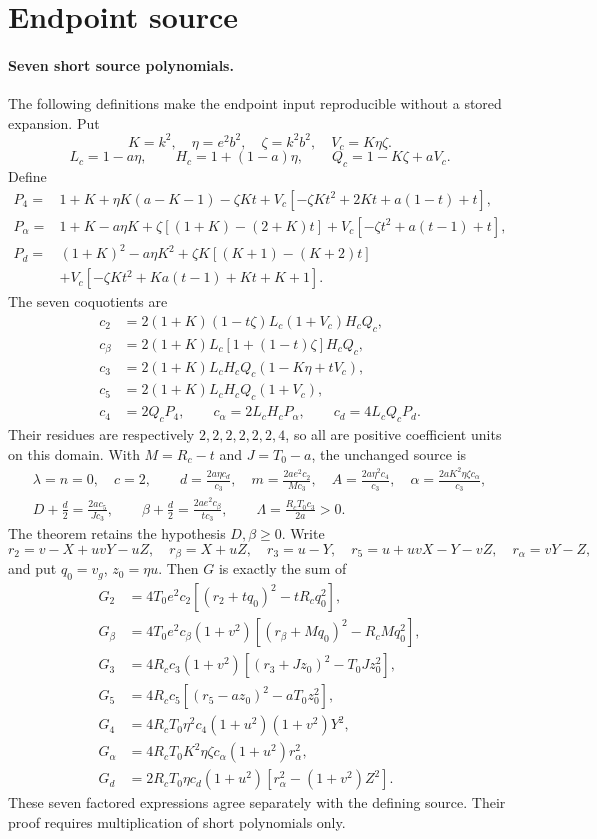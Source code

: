 \section{\texorpdfstring{Endpoint source}{Endpoint source}}
\label{component:p7d4e5164e84a}
\paragraph{Seven short source polynomials.}
The following definitions make the endpoint input reproducible without a stored expansion. Put
\[
K=k^2,\quad \eta=e^2b^2,\quad\zeta=k^2b^2,\quad V_c=K\eta\zeta.
\]
\[
L_c=1-a\eta,\qquad H_c=1+(1-a)\eta,\qquad Q_c=1-K\zeta+aV_c.
\]
Define
\begin{align*}
P_4={}&1+K+\eta K(a-K-1)-\zeta Kt
 +V_c[-\zeta Kt^2+2Kt+a(1-t)+t],\\
P_\alpha={}&1+K-a\eta K+\zeta[(1+K)-(2+K)t]
 +V_c[-\zeta t^2+a(t-1)+t],\\
P_d={}&(1+K)^2-a\eta K^2+\zeta K[(K+1)-(K+2)t]\\
&+V_c[-\zeta Kt^2+Ka(t-1)+Kt+K+1].
\end{align*}
The seven coquotients are
\begin{align*}
c_2&=2(1+K)(1-t\zeta)L_c(1+V_c)H_cQ_c,\\
c_\beta&=2(1+K)L_c[1+(1-t)\zeta]H_cQ_c,\\
c_3&=2(1+K)L_cH_cQ_c(1-K\eta+tV_c),\\
c_5&=2(1+K)L_cH_cQ_c(1+V_c),\\
c_4&=2Q_cP_4,\qquad c_\alpha=2L_cH_cP_\alpha,
\qquad c_d=4L_cQ_cP_d.
\end{align*}
Their residues are respectively $2,2,2,2,2,2,4$, so all are positive coefficient units on this domain. With $M=R_c-t$ and $J=T_0-a$, the unchanged source is
\begin{gather*}
\lambda=n=0,\quad c=2,\qquad
d=\frac{2a\eta c_d}{c_3},\quad m=\frac{2ae^2c_2}{Mc_3},\quad
A=\frac{2a\eta^2c_4}{c_3},\quad
\alpha=\frac{2aK^2\eta\zeta c_\alpha}{c_3},\\
D+\frac d2=\frac{2ac_5}{Jc_3},\qquad
\beta+\frac d2=\frac{2ae^2c_\beta}{tc_3},\qquad
\Lambda=\frac{R_cT_0c_3}{2a}>0.
\end{gather*}
The theorem retains the hypothesis $D,\beta\ge0$. Write
\[
r_2=v-X+uvY-uZ,\quad r_\beta=X+uZ,\quad r_3=u-Y,
\quad r_5=u+uvX-Y-vZ,\quad r_\alpha=vY-Z,
\]
and put $q_0=v_g$, $z_0=\eta u$. Then $G$ is exactly the sum of
\begin{align*}
G_2&=4T_0e^2c_2[(r_2+tq_0)^2-tR_cq_0^2],\\
G_\beta&=4T_0e^2c_\beta(1+v^2)[(r_\beta+Mq_0)^2-R_cMq_0^2],\\
G_3&=4R_cc_3(1+v^2)[(r_3+Jz_0)^2-T_0Jz_0^2],\\
G_5&=4R_cc_5[(r_5-az_0)^2-aT_0z_0^2],\\
G_4&=4R_cT_0\eta^2c_4(1+u^2)(1+v^2)Y^2,\\
G_\alpha&=4R_cT_0K^2\eta\zeta c_\alpha(1+u^2)r_\alpha^2,\\
G_d&=2R_cT_0\eta c_d(1+u^2)[r_\alpha^2-(1+v^2)Z^2].
\end{align*}
These seven factored expressions agree separately with the defining source. Their proof requires multiplication of short polynomials only.


